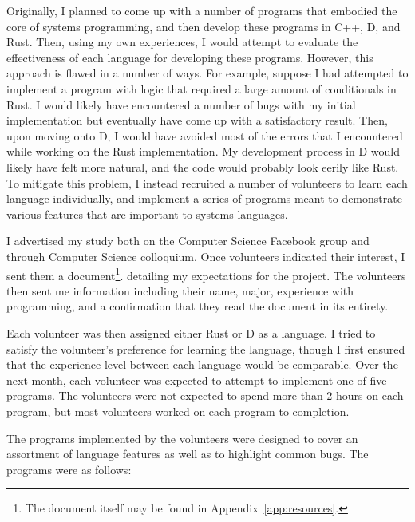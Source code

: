 \documentclass[finalcopy]{srpaper}
\begin{document}
Originally, I planned to come up with a number of programs that embodied the
core of systems programming, and then develop these programs in C++, D, and
Rust. Then, using my own experiences, I would attempt to evaluate the
effectiveness of each language for developing these programs. However, this
approach is flawed in a number of ways. For example, suppose I had attempted to
implement a program with logic that required a large amount of conditionals in
Rust. I would likely have encountered a number of bugs with my initial
implementation but eventually have come up with a satisfactory result. Then,
upon moving onto D, I would have avoided most of the errors that I encountered
while working on the Rust implementation. My development process in D would
likely have felt more natural, and the code would probably look eerily like
Rust. To mitigate this problem, I instead recruited a number of volunteers to
learn each language individually, and implement a series of programs meant to
demonstrate various features that are important to systems languages.

I advertised my study both on the Computer Science Facebook group and through
Computer Science colloquium. Once volunteers indicated their interest, I sent
them a document\footnote{The document itself may be found in
Appendix~\ref{app:resources}.}. detailing my expectations for the project. The
volunteers then sent me information including their name, major, experience
with programming, and a confirmation that they read the document in its
entirety.

Each volunteer was then assigned either Rust or D as a language. I tried to
satisfy the volunteer's preference for learning the language, though I first
ensured that the experience level between each language would be comparable.
Over the next month, each volunteer was expected to attempt to implement one
of five programs. The volunteers were not expected to spend more than 2 hours
on each program, but most volunteers worked on each program to completion.

The programs implemented by the volunteers were designed to cover an
assortment of language features as well as to highlight common bugs. The
programs were as follows:
\end{document}
